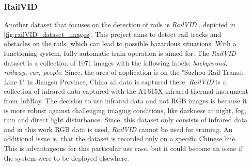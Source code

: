 \subsubsection{RailVID}
\label{subsubsec:railVID}
Another dataset that focuses on the detection of rails is \textit{RailVID} \cite{yuan2022railvid}, depicted in \autoref{fig:railVID_dataset_images}. This project aims to detect rail tracks and obstacles on the rails, which can lead to possible hazardous situations. With a functioning system, fully automatic train operation is aimed for. The \textit{RailVID} dataset is a collection of 1071 images with the following labels: \textit{background, railway, car, people}. Since, the area of application is on the "Suzhou Rail Transit Line 1" in Jiangsu Province, China all data is captured there. \textit{RailVID} is a collection of infrared data captured with the AT615X infrared thermal instrument from InfiRay. The decision to use infrared data and not RGB images is because it is more robust against challenging imaging conditions, like darkness at night, fog, rain and direct light disturbance.
Since, this dataset only consists of infrared data and in this work \ac{RGB} data is used, \textit{RailVID} cannot be used for training. An additional issue is, that the dataset is recorded only on a specific Chinese line. This is advantageous for this particular use case, but it could become an issue if the system were to be deployed elsewhere.

